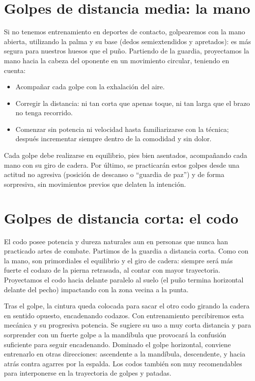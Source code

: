 \section{Golpes de distancia media: la mano}

Si no tenemos entrenamiento en deportes de contacto, golpearemos con la mano abierta, utilizando la palma y su base (dedos semiextendidos y apretados): es más segura para nuestros huesos que el puño. Partiendo de la guardia, proyectamos la mano hacia la cabeza del oponente en un movimiento circular, teniendo en cuenta:

\begin{itemize}
  \item Acompañar cada golpe con la exhalación del aire.
  \item Corregir la distancia: ni tan corta que apenas toque, ni tan larga que el brazo no tenga recorrido.
  \item Comenzar sin potencia ni velocidad hasta familiarizarse con la técnica; después incrementar siempre dentro de la comodidad y sin dolor.
\end{itemize}

Cada golpe debe realizarse en equilibrio, pies bien asentados, acompañando cada mano con su giro de cadera. Por último, se practicarán estos golpes desde una actitud no agresiva (posición de descanso o \enquote{guardia de paz}) y de forma sorpresiva, sin movimientos previos que delaten la intención.

\section{Golpes de distancia corta: el codo}

El codo posee potencia y dureza naturales aun en personas que nunca han practicado artes de combate. Partimos de la guardia a distancia corta. Como con la mano, son primordiales el equilibrio y el giro de cadera: siempre será más fuerte el codazo de la pierna retrasada, al contar con mayor trayectoria. Proyectamos el codo hacia delante paralelo al suelo (el puño termina horizontal delante del pecho) impactando con la zona vecina a la punta.

Tras el golpe, la cintura queda colocada para sacar el otro codo girando la cadera en sentido opuesto, encadenando codazos. Con entrenamiento percibiremos esta mecánica y su progresiva potencia. Se sugiere su uso a muy corta distancia y para sorprender con un fuerte golpe a la mandíbula que provocará la confusión suficiente para seguir encadenando. Dominado el golpe horizontal, conviene entrenarlo en otras direcciones: ascendente a la mandíbula, descendente, y hacia atrás contra agarres por la espalda. Los codos también son muy recomendables para interponerse en la trayectoria de golpes y patadas.


